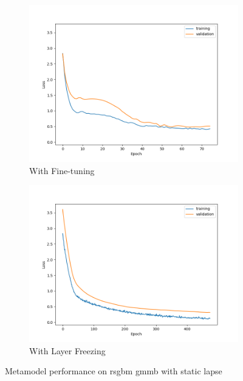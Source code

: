 \begin{figure}[ht!]
\begin{subfigure}{0.48\textwidth}
        \includegraphics[width=\textwidth]{./project3/figures/figure1c.png}
        \caption{With Fine-tuning}
        \label{subfig3-1:fineTuning}
    \end{subfigure}\hfill
    \begin{subfigure}{0.48\textwidth}
        \includegraphics[width=\textwidth]{./project3/figures/figure1d.png}
        \caption{With Layer Freezing}
        \label{subfig3-1:layerFreezing}
    \end{subfigure}
    \caption{Metamodel performance on \gls{rsgbm} \gls{gmmb} with static lapse}
    \label{fig3:figure1}
\end{figure}

